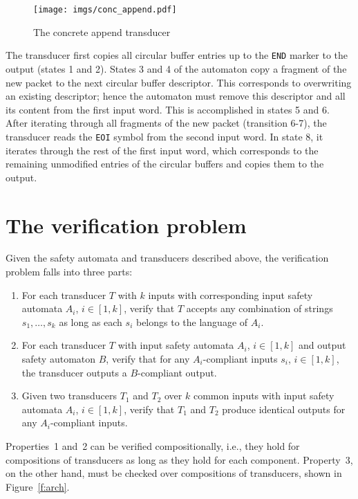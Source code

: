 \documentclass{article}
\begin{document}
\begin{figure}[t]
    \center
    \texttt{[image: imgs/conc\_append.pdf]}
    \caption{The concrete append transducer}\label{f:conc_append}
\end{figure}

The transducer first copies all circular buffer entries up to the 
\texttt{END} marker to the output (states 1 and 2).  States 3 and 
4 of the automaton copy a fragment of the new packet to the next 
circular buffer descriptor.  This corresponds to overwriting an 
existing descriptor; hence the automaton must remove this 
descriptor and all its content from the first input word.  This is 
accomplished in states 5 and 6.  After iterating through all 
fragments of the new packet (transition 6-7), the transducer reads 
the \texttt{EOI} symbol from the second input word.  In state 8, 
it iterates through the rest of the first input word, which 
corresponds to the remaining unmodified entries of the circular 
buffers and copies them to the output.  

\section{The verification problem}

Given the safety automata and transducers described above, the 
verification problem falls into three parts:

\begin{enumerate}
    \item For each transducer $T$ with $k$ inputs with 
        corresponding input safety automata $A_i$, $i\in [1,k]$, 
        verify that $T$ accepts any combination of strings 
        $s_1,\ldots,s_k$ as long as each $s_i$ belongs to the 
        language of $A_i$.

    \item For each transducer $T$ with input safety automata 
        $A_i$, $i\in [1,k]$ and output safety automaton $B$, 
        verify that for any $A_i$-compliant inputs $s_i$, 
        $i\in[1,k]$, the transducer outputs a $B$-compliant 
        output.

    \item Given two transducers $T_1$ and $T_2$ over $k$ common 
        inputs with input safety automata $A_i$, $i \in [1,k]$, 
        verify that $T_1$ and $T_2$ produce identical outputs for 
        any $A_i$-compliant inputs.
\end{enumerate}

Properties~1 and~2 can be verified compositionally, i.e., they 
hold for compositions of transducers as long as they hold for each 
component.  Property~3, on the other hand, must be checked over 
compositions of transducers, shown in Figure~\ref{f:arch}.
\end{document}
